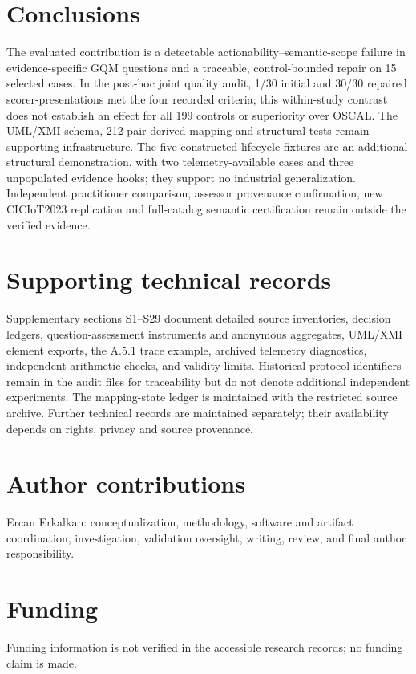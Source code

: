 \documentclass[12pt,a4paper]{article}
\begin{document}
\section{Conclusions}\label{sec:conclusions}
The evaluated contribution is a detectable actionability--semantic-scope failure in evidence-specific GQM questions and a traceable, control-bounded repair on 15 selected cases. In the post-hoc joint quality audit, 1/30 initial and 30/30 repaired scorer-presentations met the four recorded criteria; this within-study contrast does not establish an effect for all 199 controls or superiority over OSCAL. The UML/XMI schema, 212-pair derived mapping and structural tests remain supporting infrastructure. The five constructed lifecycle fixtures are an additional structural demonstration, with two telemetry-available cases and three unpopulated evidence hooks; they support no industrial generalization. Independent practitioner comparison, assessor provenance confirmation, new CICIoT2023 replication and full-catalog semantic certification remain outside the verified evidence.

\section*{Supporting technical records}
Supplementary sections S1--S29 document detailed source inventories, decision ledgers, question-assessment instruments and anonymous aggregates, UML/XMI element exports, the A.5.1 trace example, archived telemetry diagnostics, independent arithmetic checks, and validity limits. Historical protocol identifiers remain in the audit files for traceability but do not denote additional independent experiments. The mapping-state ledger is maintained with the restricted source archive. Further technical records are maintained separately; their availability depends on rights, privacy and source provenance.
\section*{Author contributions}
Ercan Erkalkan: conceptualization, methodology, software and artifact coordination, investigation, validation oversight, writing, review, and final author responsibility.
\section*{Funding}
Funding information is not verified in the accessible research records; no funding claim is made.

\end{document}
